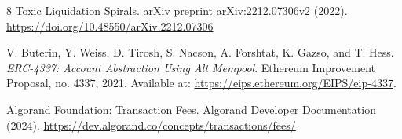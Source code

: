 \documentclass[runningheads]{llncs}
\begin{document}
\begin{thebibliography}{8}
Toxic Liquidation Spirals.
arXiv preprint arXiv:2212.07306v2 (2022).
\url{https://doi.org/10.48550/arXiv.2212.07306}

V. Buterin, Y. Weiss, D. Tirosh, S. Nacson, A. Forshtat, K. Gazso, and T. Hess.
\textit{ERC-4337: Account Abstraction Using Alt Mempool}.
Ethereum Improvement Proposal, no. 4337, 2021.
Available at: \url{https://eips.ethereum.org/EIPS/eip-4337}.

Algorand Foundation: Transaction Fees. Algorand Developer Documentation (2024).
\url{https://dev.algorand.co/concepts/transactions/fees/}

\end{thebibliography}
\end{document}
